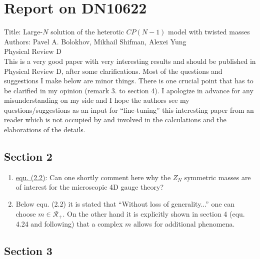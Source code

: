 \documentclass[a4paper,12pt]{article}
\begin{document}
\section*{Report on DN10622}

Title: Large-$N$ solution of the heterotic $CP(N-1)$ model with
twisted masses\\

Authors: Pavel A. Bolokhov, Mikhail Shifman, Alexei Yung\\

Physical Review D\\

This is a very good paper with very interesting results and should be
published in Physical Review D, after some clarifications. Most of the
questions and suggestions I make below are minor things. There is one
crucial point that has to be clarified in my opinion (remark 3. to
section 4). I apologize in advance for any misunderstanding on my side
and I hope the authors see my questions/suggestions as an input for
``fine-tuning'' this interesting paper from an reader which is not
occupied by and involved in the calculations and the elaborations of
the details.

\subsection*{Section 2}

\begin{enumerate}

\item \underline{equ. (2.2)}: Can one shortly comment here why the
$Z_N$ symmetric masses are of interest for the microscopic 4D
gauge theory?

\item Below equ. (2.2) it is stated that ``Without loss of
generality...'' one can choose $m\in \mathcal{R}_{+}$. On the other
hand it is explicitly shown in section 4 (equ. 4.24 and following)
that a complex $m$ allows for additional phenomena.

\end{enumerate}

\subsection*{Section 3}
\end{document}
